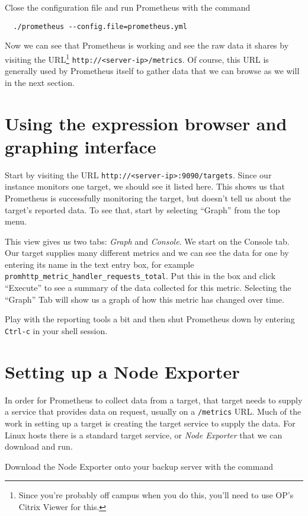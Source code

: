 \documentclass{article}   	%
\begin{document}
Close the configuration file and run Prometheus with the command 

\begin{verbatim}
  ./prometheus --config.file=prometheus.yml
\end{verbatim} 

Now we can see that Prometheus is working and see the raw data it shares by visiting the URL\footnote{Since you're probably off campus when you do this, you'll need to use OP's Citrix Viewer for this.} \texttt{http://<server-ip>/metrics}. Of course, this URL is generally used by Prometheus itself to gather data that we can browse as we will in the next section.

\section{Using the expression browser and graphing interface}
Start by visiting the URL \texttt{http://<server-ip>:9090/targets}. Since our instance monitors one target, we should see it listed here. This shows us that Prometheus is successfully monitoring the target, but doesn't tell us about the target's reported data. To see that, start by selecting ``Graph'' from the top menu.

This view gives us two tabs: \emph{Graph} and \emph{Console}. We start on the Console tab. Our target supplies many different metrics and we can see the data for one by entering its name in the text entry box, for example \texttt{promhttp\_metric\_handler\_requests\_total}. Put this in the box and click ``Execute'' to see a summary of the data collected for this metric. Selecting the ``Graph'' Tab will show us a graph of how this metric has changed over time.

Play with the reporting tools a bit and then shut Prometheus down by entering \texttt{Ctrl-c} in your shell session.

\section{Setting up a Node Exporter}
In order for Prometheus to collect data from a target, that target needs to supply a service that provides data on request, usually on a \texttt{/metrics} URL. Much of the work in setting up a target is creating the target service to supply the data. For Linux hosts there is a standard target service, or \emph{Node Exporter} that we can download and run.

Download the Node Exporter onto your backup server with the command
\end{document}

